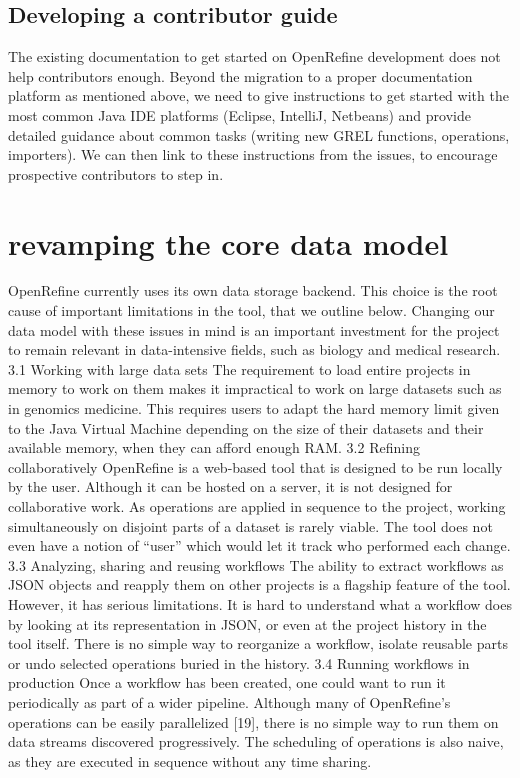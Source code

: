 \documentclass[]{elsarticle} %
\begin{document}
\hypertarget{developing-a-contributor-guide}{%
\subsection{Developing a contributor guide}\label{developing-a-contributor-guide}}

The existing documentation to get started on OpenRefine development does
not help contributors enough. Beyond the migration to a proper documentation platform as mentioned above, we need to give instructions to get started
with the most common Java IDE platforms (Eclipse, IntelliJ, Netbeans) and
provide detailed guidance about common tasks (writing new GREL functions, operations, importers). We can then link to these instructions from the
issues, to encourage prospective contributors to step in.

\hypertarget{revamping-the-core-data-model}{%
\section{revamping the core data model}\label{revamping-the-core-data-model}}

OpenRefine currently uses its own data storage backend. This choice is the
root cause of important limitations in the tool, that we outline below. Changing our data model with these issues in mind is an important investment for
the project to remain relevant in data-intensive fields, such as biology and
medical research.
3.1 Working with large data sets
The requirement to load entire projects in memory to work on them makes
it impractical to work on large datasets such as in genomics medicine. This
requires users to adapt the hard memory limit given to the Java Virtual
Machine depending on the size of their datasets and their available memory,
when they can afford enough RAM.
3.2 Refining collaboratively
OpenRefine is a web-based tool that is designed to be run locally by the user.
Although it can be hosted on a server, it is not designed for collaborative
work. As operations are applied in sequence to the project, working simultaneously on disjoint parts of a dataset is rarely viable. The tool does not
even have a notion of ``user'' which would let it track who performed each
change.
3.3 Analyzing, sharing and reusing workflows
The ability to extract workflows as JSON objects and reapply them on other
projects is a flagship feature of the tool. However, it has serious limitations.
It is hard to understand what a workflow does by looking at its representation in JSON, or even at the project history in the tool itself. There is no
simple way to reorganize a workflow, isolate reusable parts or undo selected
operations buried in the history.
3.4 Running workflows in production
Once a workflow has been created, one could want to run it periodically as
part of a wider pipeline. Although many of OpenRefine's operations can be
easily parallelized {[}19{]}, there is no simple way to run them on data streams
discovered progressively. The scheduling of operations is also naive, as they
are executed in sequence without any time sharing.
\end{document}
